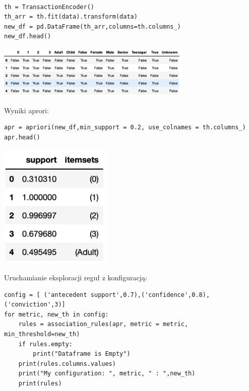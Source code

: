 \documentclass{article}
\begin{document}
{\begin{lstlisting}
    
th = TransactionEncoder()
th_arr = th.fit(data).transform(data)
new_df = pd.DataFrame(th_arr,columns=th.columns_)
new_df.head()
\end{lstlisting}

    \begin{center}
    \includegraphics[width=0.7\textwidth]{image13.png}\newline
\end{center}
\newline\newline
\large{Wyniki aprori:}
\newline\newline
\begin{lstlisting}
apr = apriori(new_df,min_support = 0.2, use_colnames = th.columns_)
apr.head()
\end{lstlisting}

    \begin{center}
    \includegraphics[width=0.4\textwidth]{image14.png}\newline
\end{center}

\large{Uruchamianie eksploracji reguł z konfiguracją:}
\begin{lstlisting}
config = [ ('antecedent support',0.7),('confidence',0.8),('conviction',3)]
for metric, new_th in config:
    rules = association_rules(apr, metric = metric, min_threshold=new_th)
    if rules.empty:
        print("Dataframe is Empty")
    print(rules.columns.values)
    print("My configuration: ", metric, " : ",new_th)
    print(rules)
    

\end{lstlisting}}
\end{document}
